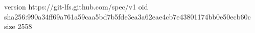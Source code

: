 version https://git-lfs.github.com/spec/v1
oid sha256:990a34ff69a761a59caa5bd7b5fde3ea3a62eae4cb7e43801174bb0e50ecb60c
size 2558
